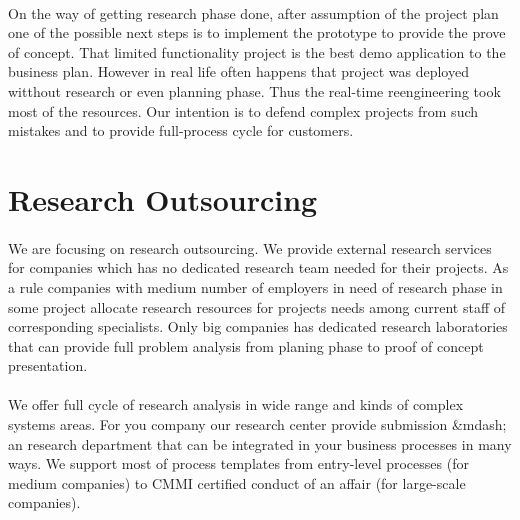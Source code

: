 \documentclass[11pt]{article}
\begin{document}
\paragraph{}
On the way of getting research phase done, after assumption of the
    project plan one of the possible next steps is to implement
    the prototype to provide the prove of concept. That limited
    functionality project is the best demo application to the business plan.
    However in real life often happens that project was deployed witthout
    research or even planning phase. Thus the real-time reengineering
    took most of the resources. Our intention is to defend complex
    projects from such mistakes and to provide full-process cycle for
    customers.

\section*{Research Outsourcing}
\paragraph{}
We are focusing on research outsourcing. We provide external research
    services for companies which has no dedicated research team needed for
    their projects. As a rule companies with medium number of employers in
    need of research phase in some project allocate research resources for
    projects needs among current staff of corresponding specialists. Only
    big companies has dedicated research laboratories that can provide full
    problem analysis from planing phase to proof of concept presentation.
\paragraph{}
We offer full cycle of research analysis in wide range and kinds of
    complex systems areas. For you company our research center provide
    submission &mdash; an research department that can be integrated in your
    business processes in many ways. We support most of process templates
    from entry-level processes (for medium companies) to CMMI certified
    conduct of an affair (for large-scale companies).
\end{document}
